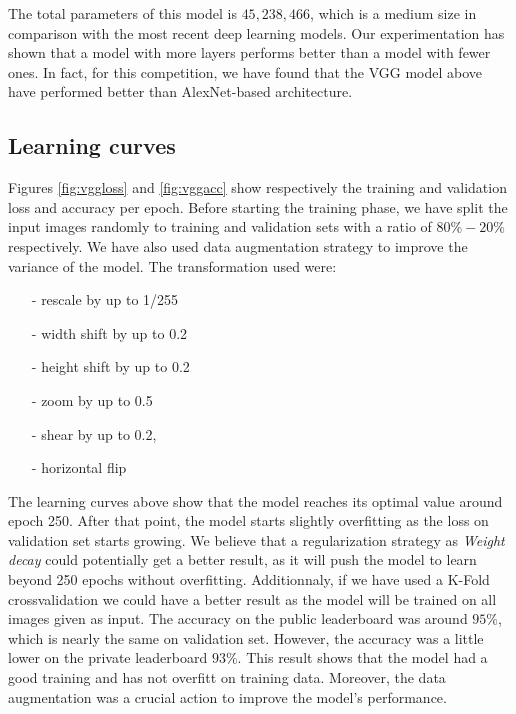 \documentclass[a4paper]{article}
\begin{document}
The total parameters of this model is $45,238,466$, which is a medium size in comparison with the most recent deep learning models.
%
Our experimentation has shown that a model with more layers performs better than a model with fewer ones. In fact, for this competition, we have found that the VGG model above have performed better than AlexNet-based architecture.

\subsection{Learning curves}
Figures \ref{fig:vggloss} and \ref{fig:vggacc} show respectively the training and validation loss and accuracy per epoch.
%
%
Before starting the training phase, we have split the input images randomly to training and validation sets with a ratio of $80\%-20\%$ respectively.
%
We have also used data augmentation strategy to improve the variance of the model. The transformation used were:
\begin{itemize}
\setlength\itemsep{0em}
\item[-]rescale by up to 1/255
\item[-]width shift by up to 0.2
\item[-]height shift by up to 0.2
\item[-]zoom by up to 0.5
\item[-]shear by up to 0.2,
\item[-]horizontal flip

\end{itemize}
%
The learning curves above show that the model reaches its optimal value around epoch 250. After that point, the model starts slightly overfitting as the loss on validation set starts growing.
%
We believe that a regularization strategy as \textit{Weight decay} could potentially get a better result, as it will push the model to learn beyond 250 epochs without overfitting. Additionnaly, if we have used a K-Fold crossvalidation we could have a better result as the model will be trained on all images given as input.
%
The accuracy on the public leaderboard was around $95\%$, which is nearly the same on validation set. However, the accuracy was a little lower on the private leaderboard $93\%$. This result shows that the model had a good training and has not overfitt on training data. Moreover, the data augmentation was a crucial action to improve the model's performance.
\end{document}
